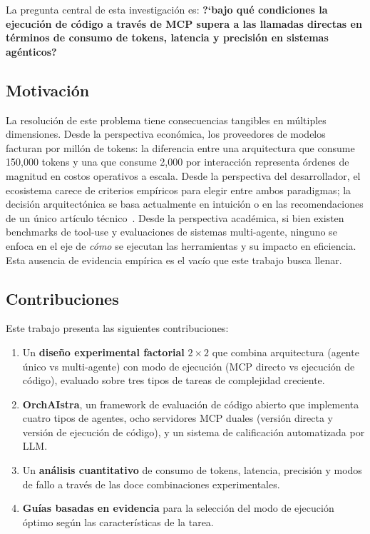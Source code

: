 \documentclass[runningheads]{llncs}
\begin{document}
La pregunta central de esta investigaci\'on es: \textbf{?`bajo qu\'e condiciones la
ejecuci\'on de c\'odigo a trav\'es de MCP supera a las llamadas directas en
t\'erminos de consumo de tokens, latencia y precisi\'on en sistemas ag\'enticos?}

\subsection{Motivaci\'on}
\label{sec:motivation}

La resoluci\'on de este problema tiene consecuencias tangibles en m\'ultiples
dimensiones. Desde la perspectiva econ\'omica, los proveedores de modelos
facturan por mill\'on de tokens: la diferencia entre una arquitectura que consume
150,000 tokens y una que consume 2,000 por interacci\'on representa \'ordenes de
magnitud en costos operativos a escala. Desde la perspectiva del desarrollador,
el ecosistema carece de criterios emp\'iricos para elegir entre ambos paradigmas;
la decisi\'on arquitect\'onica se basa actualmente en intuici\'on o en las
recomendaciones de un \'unico art\'iculo t\'ecnico~\cite{ref_codeexec}. Desde la
perspectiva acad\'emica, si bien existen benchmarks de tool-use y evaluaciones de
sistemas multi-agente, ninguno se enfoca en el eje de \textit{c\'omo} se ejecutan
las herramientas y su impacto en eficiencia. Esta ausencia de evidencia emp\'irica
es el vac\'io que este trabajo busca llenar.

\subsection{Contribuciones}
\label{sec:contributions}

Este trabajo presenta las siguientes contribuciones:

\begin{enumerate}
    \item Un \textbf{dise\~no experimental factorial} $2 \times 2$ que combina
    arquitectura (agente \'unico vs multi-agente) con modo de ejecuci\'on (MCP
    directo vs ejecuci\'on de c\'odigo), evaluado sobre tres tipos de tareas de
    complejidad creciente.

    \item \textbf{OrchAIstra}, un framework de evaluaci\'on de c\'odigo abierto
    que implementa cuatro tipos de agentes, ocho servidores MCP duales
    (versi\'on directa y versi\'on de ejecuci\'on de c\'odigo), y un sistema de
    calificaci\'on automatizada por LLM.

    \item Un \textbf{an\'alisis cuantitativo} de consumo de tokens, latencia,
    precisi\'on y modos de fallo a trav\'es de las doce combinaciones
    experimentales.

    \item \textbf{Gu\'ias basadas en evidencia} para la selecci\'on del modo de
    ejecuci\'on \'optimo seg\'un las caracter\'isticas de la tarea.
\end{enumerate}
\end{document}
